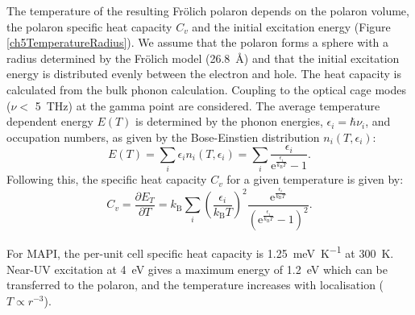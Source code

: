 \begin{table}
The temperature of the resulting Fr\"{o}lich polaron depends on the polaron volume, the polaron specific heat capacity $C_v$ and the initial excitation energy (Figure \ref{ch5TemperatureRadius}). We assume that the polaron forms a sphere with a radius determined by the Fr\"{o}lich model (\SI{26.8}{\angstrom}) and that the initial excitation energy is distributed evenly between the electron and hole. 
The heat capacity is calculated from the bulk phonon calculation. Coupling to the optical cage modes ($\nu <$ \SI{5}{\tera\hertz}\autocite{Leguy2016}) at the gamma point are considered. The average temperature dependent energy $E(T)$ is determined by the phonon energies, $\epsilon_i = \hbar\nu_i$, and occupation numbers, as given by the Bose-Einstien distribution $n_i(T,\epsilon_i)$:
\begin{equation}
    E(T) = \sum_i \epsilon_i n_i(T,\epsilon_i) = \sum_i \frac{\epsilon_i}{\textrm{e}^{\frac{\epsilon_i}{k_\mathrm{B}T}}-1}.
\end{equation}
Following this, the specific heat capacity $C_v$ for a given temperature is given by:
\begin{equation}
    C_v = \frac{\partial E_T}{\partial T} = k_\mathrm{B} \sum_i \left(\frac{\epsilon_i}{k_\mathrm{B}T}\right)^2 \frac{\textrm{e}^{\frac{\epsilon_i}{k_\mathrm{B}T}}}{\left(\textrm{e}^{\frac{\epsilon_i}{k_\mathrm{B}T}}-1\right)^2}.
\end{equation}

For MAPI, the per-unit cell specific heat capacity is \SI{1.25}{\milli\eV\per\K} at
\SI{300}{\K}. Near-UV excitation at \SI{4}{\eV} gives a maximum energy of \SI{1.2}{\eV} which can be transferred to the polaron, and the temperature increases with localisation ($T \propto r^{-3}$).


\end{table}
